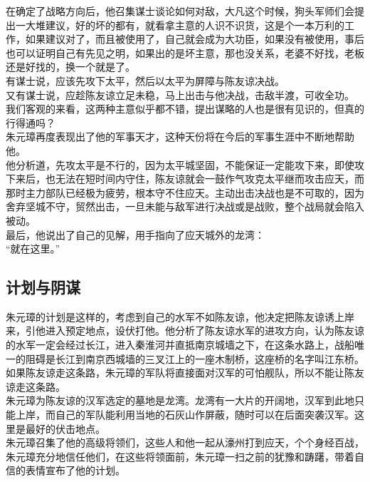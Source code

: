 \begin{multicols}{\theparacolNo}
在确定了战略方向后，他召集谋士谈论如何对敌，大凡这个时候，狗头军师们会提出一大堆建议，好的坏的都有，就看拿主意的人识不识货，这是个一本万利的工作，如果建议对了，而且被使用了，自己就会成为大功臣，如果没有被使用，事后也可以证明自己有先见之明，如果出的是坏主意，那也没关系，老婆不好找，老板还是好找的，换一个就是了。\\

有谋士说，应该先攻下太平，然后以太平为屏障与陈友谅决战。\\

又有谋士说，应趁陈友谅立足未稳，马上出击与他决战，击敌半渡，可收全功。\\

我们客观的来看，这两种主意似乎都不错，提出谋略的人也是很有见识的，但真的行得通吗？\\

朱元璋再度表现出了他的军事天才，这种天份将在今后的军事生涯中不断地帮助他。\\

他分析道，先攻太平是不行的，因为太平城坚固，不能保证一定能攻下来，即使攻下来后，也无法在短时间内守住，陈友谅就会一鼓作气攻克太平继而攻击应天，而那时主力部队已经极为疲劳，根本守不住应天。主动出击决战也是不可取的，因为舍弃坚城不守，贸然出击，一旦未能与敌军进行决战或是战败，整个战局就会陷入被动。\\

最后，他说出了自己的见解，用手指向了应天城外的龙湾：\\

“就在这里。”\\

\subsection{计划与阴谋}
朱元璋的计划是这样的，考虑到自己的水军不如陈友谅，他决定把陈友谅诱上岸来，引他进入预定地点，设伏打他。他分析了陈友谅水军的进攻方向，认为陈友谅的水军一定会经过长江，进入秦淮河并直抵南京城墙之下，在这条水路上，战船唯一的阻碍是长江到南京西城墙的三叉江上的一座木制桥，这座桥的名字叫江东桥。\\

如果陈友谅走这条路，朱元璋的军队将直接面对汉军的可怕舰队，所以不能让陈友谅走这条路。\\

朱元璋为陈友谅的汉军选定的墓地是龙湾。龙湾有一大片的开阔地，汉军到此地只能上岸，而自己的军队能利用当地的石灰山作屏蔽，随时可以在后面突袭汉军。这里是最好的伏击地点。\\

朱元璋召集了他的高级将领们，这些人和他一起从濠州打到应天，个个身经百战，朱元璋充分地信任他们，在这些将领面前，朱元璋一扫之前的犹豫和踌躇，带着自信的表情宣布了他的计划。\\


\end{multicols}
